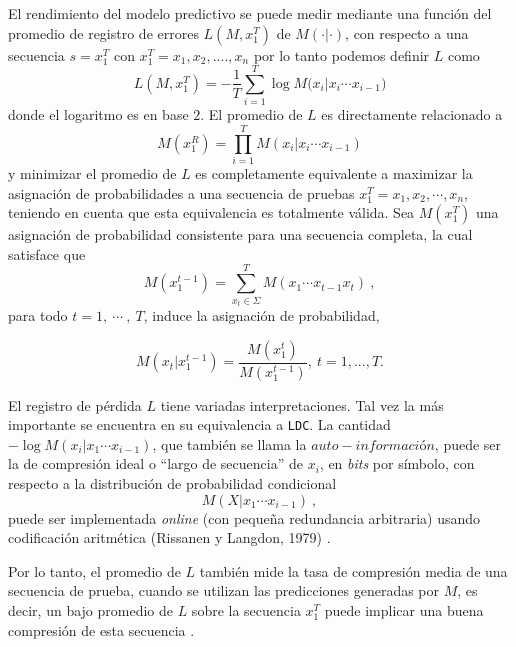 El rendimiento del modelo predictivo se puede medir mediante una función del promedio de registro de errores $L(M,x_{1}^{T})$ de $M (\cdot | \cdot )$, con respecto a una secuencia $s = x_{1}^{T}$ con $x_{1}^{T}= x_{1},x_{2},....,x_{n} $ %
  por lo tanto podemos definir $L$ como \begin{equation} L( M , x_{1}^{T} ) = 
- \dfrac{1}{T} 
\sum _{i=1}^{T} \log{ M(x_{i} | x_{i} \cdots x_{i-1}} )\end{equation}
donde el logaritmo es en base $2$.  El promedio de $L$ es directamente relacionado a  \begin{equation}M(x_{1}^{R}) = \prod_{i=1}^{T} M(x_{i} | x_{i} \cdots x_{i-1} ) \end{equation} y minimizar el promedio de $L$ es completamente equivalente a maximizar la asignación de probabilidades a una secuencia de pruebas $x_{1}^{T}= x_{1},x_{2},\cdots,x_{n} $, teniendo en cuenta que esta equivalencia es totalmente válida. Sea $M(x_{1}^{T})$ una asignación de probabilidad consistente para una secuencia completa, la cual satisface que \begin{equation}
M(x_{1}^{t-1}) = \sum_{\mbox{$x_t$} \in \Sigma}^{T} M(x_{1} \cdots x_{t-1}x_{t} ) \ , 
\end{equation}para todo $t=1,\ \cdots\ ,\ T$, induce la asignación de probabilidad,

\begin{equation}
M(x_{t} | x_{1}^{t-1} ) =  \dfrac{M(x_{1}^{t})}{M(x_{1}^{t-1} )},\ t=1,...,T.
\end{equation}


El registro de pérdida $L$ tiene variadas interpretaciones. Tal vez la más importante se encuentra en su equivalencia a \texttt{LDC}. La cantidad $- \log M (x_{i} | x_{1} \cdots x_{i-1}) $, que también se llama la $auto-información$, puede ser la de compresión ideal o ``largo de secuencia'' de $x_{i}$, en \emph{bits} por símbolo, con respecto a la distribución de probabilidad condicional  \begin{equation}M (X | x_{1} \cdots x_{i-1}) \ ,\end{equation} puede ser implementada \emph{online} (con  pequeña redundancia arbitraria) usando codificación aritmética (Rissanen y Langdon, 1979)\cite{RissanenLangdon1979} .


Por lo tanto, el promedio de $L$ también mide la tasa de compresión media de una secuencia de prueba, cuando se utilizan las predicciones generadas por $M$, es decir, un bajo promedio de $L$ %
sobre la secuencia $x_{1}^{T}$ puede implicar una buena compresión de esta secuencia \cite{Begleiter2004}.

